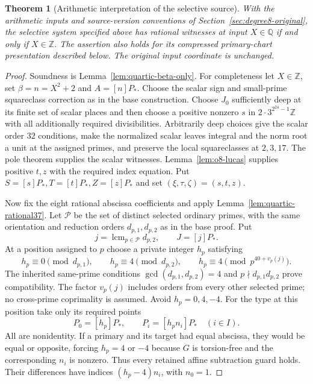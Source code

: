 \documentclass[11pt]{article}
\newtheorem{theorem}{Theorem}[section]
\theoremstyle{definition}
\theoremstyle{remark}
\newcommand{\Q}{\mathbb Q}
\newcommand{\Z}{\mathbb Z}
\begin{document}
\begin{theorem}[Arithmetic interpretation of the selective source]
\label{thm:quartic-source-arithmetic}
With the arithmetic inputs and source-version conventions of
Section~\ref{sec:degree8-original}, the selective system specified
above has rational witnesses at input $X\in\Q$ if and only if $X\in\Z$.
The assertion also holds for its compressed primary-chart presentation
described below. The original input coordinate is unchanged.
\end{theorem}
\begin{proof}
Soundness is Lemma~\ref{lem:quartic-beta-only}.
For completeness let $X\in\Z$, set $\beta=n=X^2+2$ and $A=[n]P_*$.
Choose the scalar sign and small-prime squareclass correction as in the
base construction. Choose $J_0$ sufficiently deep at its finite set of
scalar places and then choose a positive nonzero $s$ in
$2\cdot3^{2^{24}-1}\Z$ with all additionally required divisibilities.
Arbitrarily deep choices give the scalar order $32$ conditions, make the
normalized scalar leaves integral and the norm root a unit at the
assigned primes, and preserve the local squareclasses at $2,3,17$.
The pole theorem supplies the scalar witnesses.
Lemma~\ref{lem:o8-lucas} supplies positive $t,z$ with the required
index equation. Put $S=[s]P_*,T=[t]P_*,Z=[z]P_*$ and set
$(\xi,\tau,\zeta)=(s,t,z)$.

Now fix the eight rational abscissa coefficients and apply
Lemma~\ref{lem:quartic-rational37}. Let $\mathcal P$ be the set of
distinct selected ordinary primes, with the same orientation and
reduction orders $d_{p,1},d_{p,2}$ as in the base proof. Put
\[
 j=\operatorname{lcm}_{p\in\mathcal P}d_{p,2},\qquad J=[j]P_*.
\]
At a position assigned to $p$ choose a private integer $h_p$ satisfying
\[
 h_p\equiv0\pmod {d_{p,1}},\qquad
 h_p\equiv4\pmod {d_{p,2}},\qquad
 h_p\equiv4\pmod {p^{40+v_p(j)}}.
\]
The inherited same-prime conditions
$\gcd(d_{p,1},d_{p,2})=4$ and $p\nmid d_{p,1}d_{p,2}$ prove compatibility.
The factor $v_p(j)$ includes orders from every other selected prime;
no cross-prime coprimality is assumed. Avoid $h_p=0,4,-4$.
For the type at this position take only its required points
\[
 P_0=[h_p]P_*,\qquad P_i=[h_pn_i]P_*\quad(i\in I).
\]
All are nonidentity. If a primary and its target had equal abscissa,
they would be equal or opposite, forcing $h_p=4$ or $-4$ because
$G$ is torsion-free and the corresponding $n_i$ is nonzero. Thus every
retained affine subtraction guard holds. Their differences have indices
$(h_p-4)n_i$, with $n_0=1$.


\end{proof}
\end{document}
